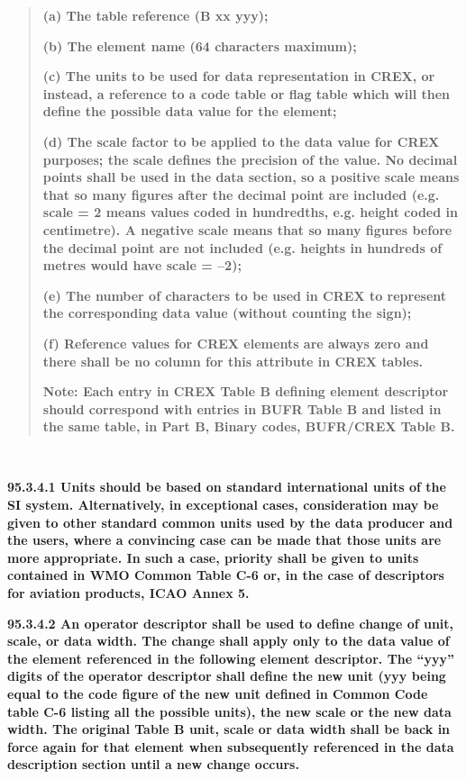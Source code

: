 \begin{quote}
\textbf{(a) The table reference (B xx yyy);}

\textbf{(b) The element name (64 characters maximum);}

\textbf{(c) The units to be used for data representation in CREX, or instead, a reference to a code table or flag table which will then define the possible data value for the element;}

\textbf{(d) The scale factor to be applied to the data value for CREX purposes; the scale defines the precision of the value. No decimal points shall be used in the data section, so a positive scale means that so many figures after the decimal point are included (e.g. scale = 2 means values coded in hundredths, e.g. height coded in centimetre). A negative scale means that so many figures before the decimal point are not included (e.g. heights in hundreds of metres would have scale = --2);}

\textbf{(e) The number of characters to be used in CREX to represent the corresponding data value (without counting the sign);}

\textbf{(f) Reference values for CREX elements are always zero and there shall be no column for this attribute in CREX tables.}

\textbf{Note: Each entry in CREX Table B defining element descriptor should correspond with entries in BUFR Table B and listed in the same table, in Part B, Binary codes, BUFR/CREX Table B.}
\end{quote}

\textbf{\\
}

\textbf{95.3.4.1 Units should be based on standard international units of the SI system. Alternatively, in exceptional cases, consideration may be given to other standard common units used by the data producer and the users, where a convincing case can be made that those units are more appropriate. In such a case, priority shall be given to units contained in WMO Common Table C-6 or, in the case of descriptors for aviation products, ICAO Annex 5.}

\textbf{95.3.4.2 An operator descriptor shall be used to define change of unit, scale, or data width. The change shall apply only to the data value of the element referenced in the following element descriptor. The ``yyy'' digits of the operator descriptor shall define the new unit (yyy being equal to the code figure of the new unit defined in Common Code table C-6 listing all the possible units), the new scale or the new data width. The original Table B unit, scale or data width shall be back in force again for that element when subsequently referenced in the data description section until a new change occurs.}

